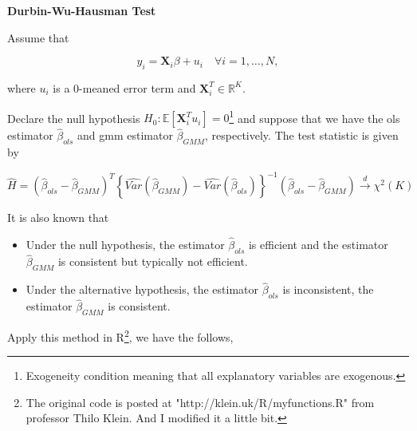 \documentclass[
  12pt,
]{article}
\providecommand{\tightlist}{%
  \setlength{\itemsep}{0pt}\setlength{\parskip}{0pt}}
\begin{document}
\noindent
\textbf{Durbin-Wu-Hausman Test}

\noindent
Assume that

\[ y_i = \mathbf{X}_i \beta + u_i \quad \forall i = 1, \dots, N, \]

where \(u_i\) is a 0-meaned error term and \(\mathbf{X}_i^T \in \mathbb{R}^K\).

Declare the null hypothesis \(H_0: \mathbb{E}[\mathbf{X}_i^T u_i] = 0\)\footnote{Exogeneity condition meaning that all explanatory variables are exogenous.} and suppose that we have the ols estimator \(\hat{\beta}_{ols}\) and gmm estimator \(\hat{\beta}_{GMM}\), respectively. The test statistic is given by

\[
    \hat{H} = \left(\hat{\beta}_{ols} - \hat{\beta}_{GMM} \right)^T \left\{\widehat{Var}(\hat{\beta}_{GMM}) - \widehat{Var}(\hat{\beta}_{ols}) \right\}^{-1} \left(\hat{\beta}_{ols} - \hat{\beta}_{GMM} \right) \stackrel{d}{\to} \chi^2 (K)
\]

It is also known that

\begin{itemize}
\tightlist
\item
  Under the null hypothesis, the estimator \(\hat{\beta}_{ols}\) is efficient and the estimator \(\hat{\beta}_{GMM}\) is consistent but typically not efficient.
\item
  Under the alternative hypothesis, the estimator \(\hat{\beta}_{ols}\) is inconsistent, the estimator \(\hat{\beta}_{GMM}\) is consistent.
\end{itemize}

Apply this method in R\footnote{The original code is posted at "http://klein.uk/R/myfunctions.R" from professor Thilo Klein. And I modified it a little bit.}, we have the follows,
\end{document}
